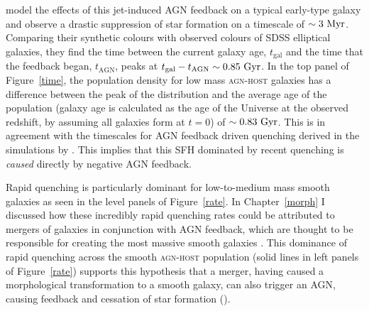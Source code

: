 \cite{tortora09} model the effects of this jet-induced AGN feedback on a typical early-type galaxy and observe a drastic suppression of star formation on a timescale of $\sim 3 ~\rm{Myr}$. Comparing their synthetic colours with observed colours of SDSS elliptical galaxies, they find the time between the current galaxy age, $t_\mathrm{gal}$ and the time that the feedback began, $t_\mathrm{AGN}$, peaks at $t_\mathrm{gal} - t_\mathrm{AGN} \sim 0.85 ~\rm{Gyr}$. In the top panel of Figure~\ref{time}, the population density for low mass \textsc{agn-host} galaxies has a difference between the peak of the distribution and the average age of the population (galaxy age is calculated as the age of the Universe at the observed redshift, by assuming all galaxies form at $t=0$) of $\sim0.83 ~\rm{Gyr}$. This is in agreement with the timescales for AGN feedback driven quenching derived in the simulations by \citet{tortora09}. This implies that this SFH dominated by recent quenching is \emph{caused} directly by negative AGN feedback.

Rapid quenching is particularly dominant for low-to-medium mass smooth galaxies as seen in the level panels of Figure~\ref{rate}. In Chapter~\ref{morph} I discussed how these incredibly rapid quenching rates could be attributed to mergers of galaxies in conjunction with AGN feedback, which are thought to be responsible for creating the most massive smooth galaxies \citep{conselice03b, springel05b, hopkins08b}. This dominance of rapid quenching across the smooth \textsc{agn-host} population (solid lines in left panels of Figure~\ref{rate}) supports this hypothesis that a merger, having caused a morphological transformation to a smooth galaxy, can also trigger an AGN, causing feedback and cessation of star formation (\citealt{Sanders88, pontzen16}).

